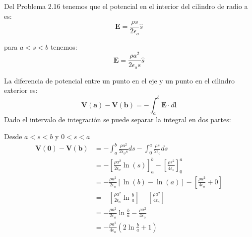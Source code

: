 \documentclass[12pt]{article}
\begin{document}
Del Problema 2.16 tenemos que el potencial en el interior del cilindro de radio a es:
\[
\mathbf{E} = \frac{\rho s}{2\epsilon_o }  \hat{s}
\]

para \( a < s < b \) tenemos:
\[
\mathbf{E} = \frac{\rho a^2}{2\epsilon_o s }  \hat{s}
\]

La diferencia de potencial entre un punto en el eje y un punto en el cilindro exterior es:
\[
\mathbf{V(a)}-\mathbf{V(b)}   = -\int_{a}^{b} \mathbf{E}\cdot d \mathbf{l}  
\]
Dado el intervalo de integración se puede separar la integral en dos partes:

Desde  \(a < s < b\) y  \(0 < s <a\)
\begin{align*}
    \mathbf{V(0)}-\mathbf{V(b)}   &= -\int_{a}^{b} \frac{\rho a^2}{2\epsilon_o s } ds - \int_{0}^{a} \frac{\rho s}{2\epsilon_o } ds \\
    &= -\left[\frac{\rho a^2}{2\epsilon_o} \ln(s) \right]_{a}^{b} - \left[\frac{\rho s^2}{4\epsilon_o} \right]_{0}^{a} \\
    &= -\frac{\rho a^2}{2\epsilon_o} \left[\ln(b) -\ln(a)  \right] - \left[\frac{\rho a^2}{4\epsilon_o} + 0 \right] \\
    &= -\left[\frac{\rho a^2}{2\epsilon_o} \ln{\frac{b}{a} } \right] - \left[\frac{\rho a^2}{4\epsilon_o} \right] \\
    &= -\frac{\rho a^2}{2\epsilon_o} \ln{\frac{b}{a} } - \frac{\rho a^2}{4\epsilon_o}\\
    &= -\frac{\rho a^2}{4\epsilon_o} \left(2\ln{\frac{b}{a} } + 1 \right) \\
\end{align*}
\end{document}
